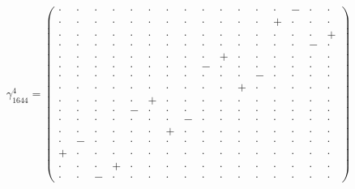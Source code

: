\documentclass[
  10pt,
]{article}
\begin{document}
\[\gamma_{1644}^4=\left(\begin{smallmatrix} \cdot & \cdot & \cdot & \cdot & \cdot & \cdot & \cdot & \cdot & \cdot & \cdot & \cdot & \cdot & \cdot & - & \cdot & \cdot \\ \cdot & \cdot & \cdot & \cdot & \cdot & \cdot & \cdot & \cdot & \cdot & \cdot & \cdot & \cdot & + & \cdot & \cdot & \cdot \\ \cdot & \cdot & \cdot & \cdot & \cdot & \cdot & \cdot & \cdot & \cdot & \cdot & \cdot & \cdot & \cdot & \cdot & \cdot & + \\ \cdot & \cdot & \cdot & \cdot & \cdot & \cdot & \cdot & \cdot & \cdot & \cdot & \cdot & \cdot & \cdot & \cdot & - & \cdot \\ \cdot & \cdot & \cdot & \cdot & \cdot & \cdot & \cdot & \cdot & \cdot & + & \cdot & \cdot & \cdot & \cdot & \cdot & \cdot \\ \cdot & \cdot & \cdot & \cdot & \cdot & \cdot & \cdot & \cdot & - & \cdot & \cdot & \cdot & \cdot & \cdot & \cdot & \cdot \\ \cdot & \cdot & \cdot & \cdot & \cdot & \cdot & \cdot & \cdot & \cdot & \cdot & \cdot & - & \cdot & \cdot & \cdot & \cdot \\ \cdot & \cdot & \cdot & \cdot & \cdot & \cdot & \cdot & \cdot & \cdot & \cdot & + & \cdot & \cdot & \cdot & \cdot & \cdot \\ \cdot & \cdot & \cdot & \cdot & \cdot & + & \cdot & \cdot & \cdot & \cdot & \cdot & \cdot & \cdot & \cdot & \cdot & \cdot \\ \cdot & \cdot & \cdot & \cdot & - & \cdot & \cdot & \cdot & \cdot & \cdot & \cdot & \cdot & \cdot & \cdot & \cdot & \cdot \\ \cdot & \cdot & \cdot & \cdot & \cdot & \cdot & \cdot & - & \cdot & \cdot & \cdot & \cdot & \cdot & \cdot & \cdot & \cdot \\ \cdot & \cdot & \cdot & \cdot & \cdot & \cdot & + & \cdot & \cdot & \cdot & \cdot & \cdot & \cdot & \cdot & \cdot & \cdot \\ \cdot & - & \cdot & \cdot & \cdot & \cdot & \cdot & \cdot & \cdot & \cdot & \cdot & \cdot & \cdot & \cdot & \cdot & \cdot \\ + & \cdot & \cdot & \cdot & \cdot & \cdot & \cdot & \cdot & \cdot & \cdot & \cdot & \cdot & \cdot & \cdot & \cdot & \cdot \\ \cdot & \cdot & \cdot & + & \cdot & \cdot & \cdot & \cdot & \cdot & \cdot & \cdot & \cdot & \cdot & \cdot & \cdot & \cdot \\ \cdot & \cdot & - & \cdot & \cdot & \cdot & \cdot & \cdot & \cdot & \cdot & \cdot & \cdot & \cdot & \cdot & \cdot & \cdot \end{smallmatrix}\right)\qquad
\]
\end{document}
